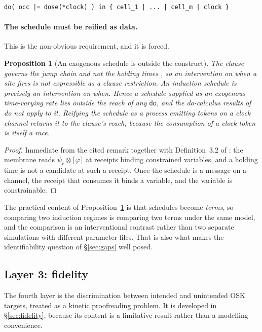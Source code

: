 \documentclass[11pt,a4paper]{article}
\theoremstyle{plain}
\newtheorem{proposition}[theorem]{Proposition}
\theoremstyle{definition}
\theoremstyle{remark}
\newcommand{\tensorv}{\otimes}
\newcommand{\crisp}[1]{\lceil #1 \rceil}
\newcommand{\dok}{\textsf{do}}
\begin{document}
\begin{lstlisting}
do( occ |= dose(*clock) ) in { cell_1 | ... | cell_m | clock }
\end{lstlisting}

\paragraph{The schedule must be reified as data.} This is the non-obvious
requirement, and it is forced.

\begin{proposition}[An exogenous schedule is outside the construct]
\label{prop:reify}
The clause governs the jump chain and not the holding times
\cite[Rem.~3.2]{GradedPLN}, so an intervention on \emph{when} a site fires is
not expressible as a clause restriction. An induction schedule is precisely an
intervention on when. Hence a schedule supplied as an exogenous time-varying
rate lies outside the reach of any $\dok$, and the do-calculus results of
\cite{Interventions} do not apply to it. Reifying the schedule as a process
emitting tokens on a clock channel returns it to the clause's reach, because
the consumption of a clock token is itself a race.
\end{proposition}

\begin{proof}
Immediate from the cited remark together with
Definition~3.2 of \cite{Interventions}: the membrane reads
$\psi_r \tensorv \crisp{\varphi}$ at receipts binding constrained variables,
and a holding time is not a candidate at such a receipt. Once the schedule is
a message on a channel, the receipt that consumes it binds a variable, and the
variable is constrainable.
\end{proof}

The practical content of Proposition~\ref{prop:reify} is that schedules become
\emph{terms}, so comparing two induction regimes is comparing two terms under
the same model, and the comparison is an interventional contrast rather than
two separate simulations with different parameter files. That is also what
makes the identifiability question of \S\ref{sec:gaps} well posed.

\subsection{Layer 3: fidelity}

The fourth layer is the discrimination between intended and unintended OSK
targets, treated as a kinetic proofreading problem. It is developed in
\S\ref{sec:fidelity}, because its content is a limitative result rather than a
modelling convenience.
\end{document}
